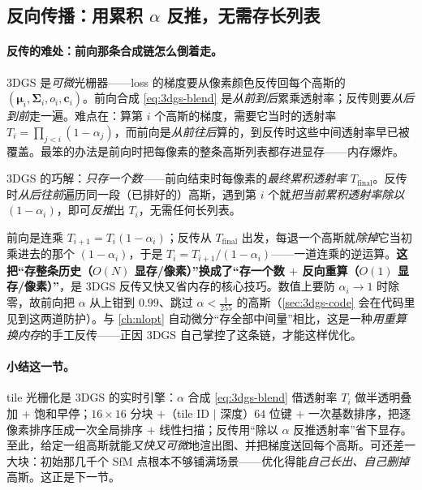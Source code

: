\subsection{反向传播：用累积 $\alpha$ 反推，无需存长列表}

\paragraph{反传的难处：前向那条合成链怎么倒着走。}
3DGS 是\emph{可微}光栅器——loss 的梯度要从像素颜色反传回每个高斯的 $(\boldsymbol\mu_i,\boldsymbol\Sigma_i,o_i,\mathbf c_i)$。前向合成 \cref{eq:3dgs-blend} 是\emph{从前到后}累乘透射率；反传则要\emph{从后到前}走一遍。难点在：算第 $i$ 个高斯的梯度，需要它当时的透射率 $T_i=\prod_{j<i}(1-\alpha_j)$，而前向是\emph{从前往后}算的，到反传时这些中间透射率早已被覆盖。最笨的办法是前向时把每像素的整条高斯列表都存进显存——内存爆炸。

3DGS 的巧解：\emph{只存一个数}——前向结束时每像素的\emph{最终累积透射率} $T_{\text{final}}$。反传时\emph{从后往前}遍历同一段（已排好的）高斯，遇到第 $i$ 个就\emph{把当前累积透射率除以 $(1-\alpha_i)$}，即可\emph{反推}出 $T_i$，无需任何长列表。

\begin{insight}
前向是连乘 $T_{i+1}=T_i(1-\alpha_i)$；反传从 $T_{\text{final}}$ 出发，每退一个高斯就\emph{除掉}它当初乘进去的那个 $(1-\alpha_i)$，于是 $T_i=T_{i+1}/(1-\alpha_i)$——一道连乘的逆运算。\textbf{这把“存整条历史（$O(N)$ 显存/像素）”换成了“存一个数 $+$ 反向重算（$O(1)$ 显存/像素）”}，是 3DGS 反传又快又省内存的核心技巧。数值上要防 $\alpha_i\to1$ 时除零，故前向把 $\alpha$ 从上钳到 $0.99$、跳过 $\alpha<\tfrac{1}{255}$ 的高斯（\cref{sec:3dgs-code} 会在代码里见到这两道防护）。与 \cref{ch:nlopt} 自动微分“存全部中间量”相比，这是一种\emph{用重算换内存}的手工反传——正因 3DGS 自己掌控了这条链，才能这样优化。
\end{insight}

\paragraph{小结这一节。}
tile 光栅化是 3DGS 的实时引擎：$\alpha$ 合成 \cref{eq:3dgs-blend} 借透射率 $T_i$ 做半透明叠加 $+$ 饱和早停；$16\times16$ 分块 $+$（tile ID $|$ 深度）$64$ 位键 $+$ 一次基数排序，把逐像素排序压成一次全局排序 $+$ 线性扫描；反传用“除以 $\alpha$ 反推透射率”省下显存。至此，给定一组高斯就能\emph{又快又可微}地渲出图、并把梯度送回每个高斯。可还差一大块：初始那几千个 SfM 点根本不够铺满场景——优化得能\emph{自己长出、自己删掉}高斯。这正是下一节。

